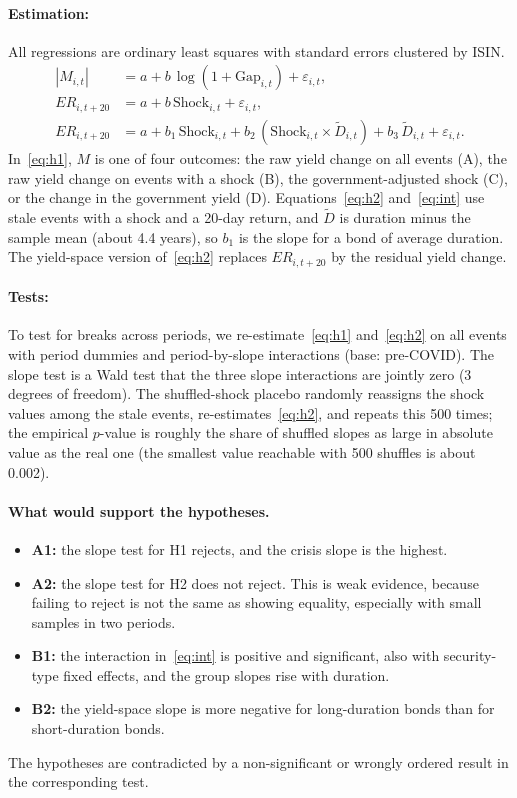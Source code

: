 \documentclass[a4paper,11pt]{article}
\begin{document}
\paragraph{Estimation:} All regressions are ordinary least squares with standard errors clustered by ISIN.
\begin{align}
|M_{i,t}| &= a + b\,\log(1+\text{Gap}_{i,t}) + \varepsilon_{i,t}, \label{eq:h1}\\
ER_{i,t+20} &= a + b\,\text{Shock}_{i,t} + \varepsilon_{i,t}, \label{eq:h2}\\
ER_{i,t+20} &= a + b_1\,\text{Shock}_{i,t} + b_2\,(\text{Shock}_{i,t}\times\tilde D_{i,t}) + b_3\,\tilde D_{i,t} + \varepsilon_{i,t}. \label{eq:int}
\end{align}
In~\eqref{eq:h1}, $M$ is one of four outcomes: the raw yield change on all events (A), the raw yield change on events with a shock (B), the government-adjusted shock (C), or the change in the government yield (D). Equations~\eqref{eq:h2} and~\eqref{eq:int} use stale events with a shock and a 20-day return, and $\tilde D$ is duration minus the sample mean (about 4.4 years), so $b_1$ is the slope for a bond of average duration. The yield-space version of~\eqref{eq:h2} replaces $ER_{i,t+20}$ by the residual yield change.

\paragraph{Tests:} To test for breaks across periods, we re-estimate~\eqref{eq:h1} and~\eqref{eq:h2} on all events with period dummies and period-by-slope interactions (base: pre-COVID). The slope test is a Wald test that the three slope interactions are jointly zero (3 degrees of freedom). The shuffled-shock placebo randomly reassigns the shock values among the stale events, re-estimates~\eqref{eq:h2}, and repeats this 500 times; the empirical $p$-value is roughly the share of shuffled slopes as large in absolute value as the real one (the smallest value reachable with 500 shuffles is about 0.002).

\paragraph{What would support the hypotheses.}
\begin{itemize}
	\item \textbf{A1:} the slope test for H1 rejects, and the crisis slope is the highest.
	\item \textbf{A2:} the slope test for H2 does not reject. This is weak evidence, because failing to reject is not the same as showing equality, especially with small samples in two periods.
	\item \textbf{B1:} the interaction in~\eqref{eq:int} is positive and significant, also with security-type fixed effects, and the group slopes rise with duration.
	\item \textbf{B2:} the yield-space slope is more negative for long-duration bonds than for short-duration bonds.
\end{itemize}
The hypotheses are contradicted by a non-significant or wrongly ordered result in the corresponding test.
\end{document}
